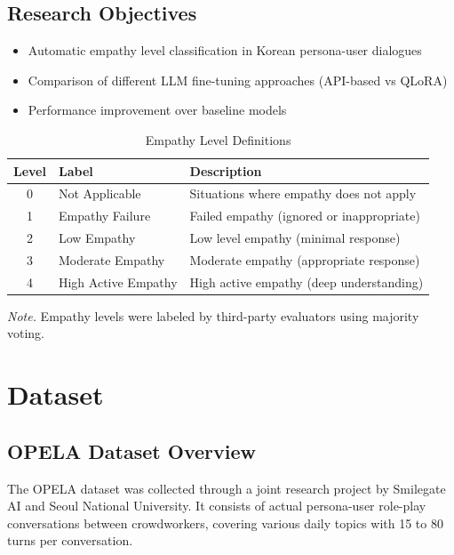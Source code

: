 \documentclass[11pt, a4paper]{article}
\begin{document}
\subsection{Research Objectives}
\begin{itemize}
    \item Automatic empathy level classification in Korean persona-user dialogues
    \item Comparison of different LLM fine-tuning approaches (API-based vs QLoRA)
    \item Performance improvement over baseline models
\end{itemize}

\begin{table}[H]
\centering
\caption{Empathy Level Definitions}
\label{tab:empathy_levels}
\begin{tabular}{clp{8cm}}
\toprule
\textbf{Level} & \textbf{Label} & \textbf{Description} \\
\midrule
0 & Not Applicable & Situations where empathy does not apply \\
1 & Empathy Failure & Failed empathy (ignored or inappropriate) \\
2 & Low Empathy & Low level empathy (minimal response) \\
3 & Moderate Empathy & Moderate empathy (appropriate response) \\
4 & High Active Empathy & High active empathy (deep understanding) \\
\bottomrule
\end{tabular}

\vspace{0.5em}
\footnotesize\textit{Note.} Empathy levels were labeled by third-party evaluators using majority voting.
\end{table}

\section{Dataset}

\subsection{OPELA Dataset Overview}
The OPELA dataset was collected through a joint research project by Smilegate AI and Seoul National University. It consists of actual persona-user role-play conversations between crowdworkers, covering various daily topics with 15 to 80 turns per conversation.
\end{document}
